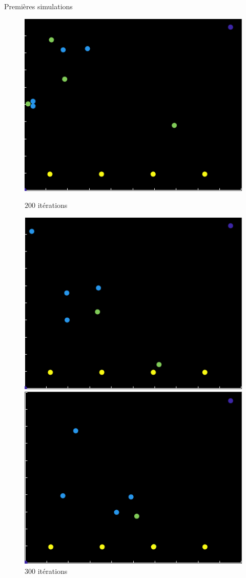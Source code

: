 \documentclass[final,hyperref={pdfpagelabels=false}]{beamer}
\begin{document}
\begin{frame}[t]
\begin{columns}[t]
\begin{column}{.465\textwidth}
\begin{block}{{\Large Premi\`eres simulations}}
\begin{figure}[h!]
\begin{minipage}[b]{0.50\linewidth}
      \centering \includegraphics[scale=1.4]{simu_200.png}
      \caption{\text{ } $200$ it\'erations}      
   \end{minipage}\hfill
   \begin{minipage}[b]{0.50\linewidth}   
      \centering \includegraphics[scale=1.4]{simu_300.png}
      \caption{\text{ } $300$ it\'erations}      
   \end{minipage}
   \begin{minipage}[b]{0.50\linewidth}
      \centering \includegraphics[scale=1.4]{simu_400.png}

\end{minipage}
\end{figure}
\end{block}
\end{column}
\end{columns}
\end{frame}
\end{document}
